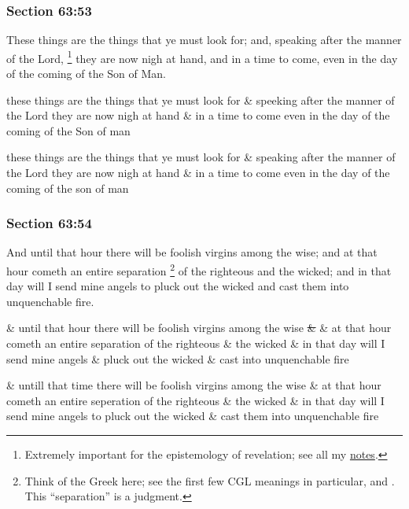 	\subsubsection{Section 63:53} %
		\label{DC63-53}

		These things are the things that ye must look for; and, speaking after the manner of the Lord,%
			\footnote{%
				Extremely important for the epistemology of revelation; see all my \hyperref[EPIST-REVELATION-DC]{notes}.
				}
		they are now nigh at hand, and in a time to come, even in the day of the coming of the Son of Man.

		\begin{framed}
		\scriptsize
			\begin{compactdesc}
				\item[JSP] these things are the things that ye must look for \& speeking after the manner of the Lord they are now nigh at hand \& in a time to come even in the day of the coming of the Son of man
				\item[RB1] these things are the things that ye must look for \& speaking after the manner of the Lord they are now nigh at hand \& in a time to come even in the day of the coming of the son of man
			\end{compactdesc}
		\end{framed}

	\subsubsection{Section 63:54} %
		\label{DC63-54}

		And until that hour there will be foolish virgins among the wise; and at that hour cometh an entire separation%
			\footnote{%
				Think of the Greek \hyperref[KRINO]{} here; see the first few CGL meanings in particular, and \hyperref[KRISIS]{}. This ``separation'' is a judgment.
				}
		of the righteous and the wicked; and in that day will I send mine angels to pluck out the wicked and cast them into unquenchable fire.

		\begin{framed}
		\scriptsize
			\begin{compactdesc}
				\item[JSP] \& until that hour there will be foolish virgins among the wise \sout{\&} \& at that hour cometh an entire separation of the righteous \& the wicked \& in that day will I send mine angels \& pluck out the wicked \& cast into unquenchable fire
				\item[RB1] \& untill that time there will be foolish virgins among the wise \& at that hour cometh an entire seperation of the righteous \& the wicked \& in that day will I send mine angels to pluck out the wicked \& cast them into unquenchable fire
			\end{compactdesc}
		\end{framed}

